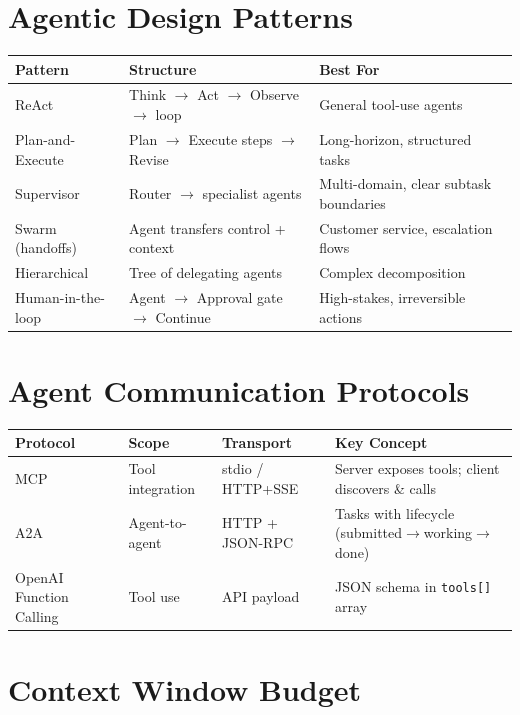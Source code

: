 \section{Agentic Design Patterns}
\label{agentic-design-patterns}

\begin{tabular}{@{}lp{5cm}p{8cm}@{}}
\toprule
\textbf{Pattern} & \textbf{Structure} & \textbf{Best For} \\
\midrule
ReAct & Think $\to$ Act $\to$ Observe $\to$ loop & General tool-use agents \\
Plan-and-Execute & Plan $\to$ Execute steps $\to$ Revise & Long-horizon, structured tasks \\
Supervisor & Router $\to$ specialist agents & Multi-domain, clear subtask boundaries \\
Swarm (handoffs) & Agent transfers control + context & Customer service, escalation flows \\
Hierarchical & Tree of delegating agents & Complex decomposition \\
Human-in-the-loop & Agent $\to$ Approval gate $\to$ Continue & High-stakes, irreversible actions \\
\bottomrule
\end{tabular}

\section{Agent Communication Protocols}
\label{agent-communication-protocols}

\begin{tabular}{@{}lp{3.5cm}p{3.5cm}p{6cm}@{}}
\toprule
\textbf{Protocol} & \textbf{Scope} & \textbf{Transport} & \textbf{Key Concept} \\
\midrule
MCP & Tool integration & stdio / HTTP+SSE & Server exposes tools; client discovers \& calls \\
A2A & Agent-to-agent & HTTP + JSON-RPC & Tasks with lifecycle (submitted$\to$working$\to$done) \\
OpenAI Function Calling & Tool use & API payload & JSON schema in \texttt{tools[]} array \\
\bottomrule
\end{tabular}

\section{Context Window Budget}
\label{context-window-budget}

